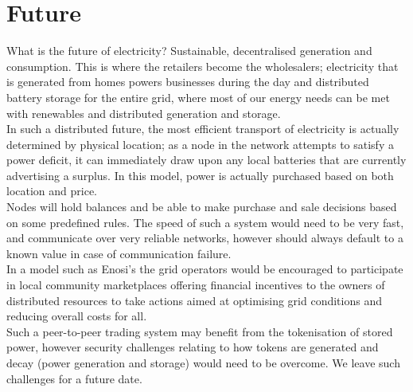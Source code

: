 \documentclass{article}
\theoremstyle{definition}
\theoremstyle{plain} %
\begin{document}




\pagebreak
\section{Future}

What is the future of electricity? Sustainable, decentralised generation and consumption. This is where the retailers become the wholesalers; electricity that is generated from homes powers businesses during the day and distributed battery storage for the entire grid, where most of our energy needs can be met with renewables and distributed generation and storage. \\

\noindent In such a distributed future, the most efficient transport of electricity is actually determined by physical location; as a node in the network attempts to satisfy a power deficit, it can immediately draw upon any local batteries that are currently advertising a surplus. In this model, power is actually purchased based on both location and price.\\

\noindent Nodes will hold balances and be able to make purchase and sale decisions based on some predefined rules. The speed of such a system would need to be very fast, and communicate over very reliable networks, however should always default to a known value in case of communication failure.\\

\noindent In a model such as Enosi's the grid operators would be encouraged to participate in local community marketplaces offering financial incentives to the owners of distributed resources to take actions aimed at optimising grid conditions and reducing overall costs for all. \\

\noindent Such a peer-to-peer trading system may benefit from the tokenisation of stored power, however security challenges relating to how tokens are generated and decay (power generation and storage) would need to be overcome. We leave such challenges for a future date.\\
\end{document}
